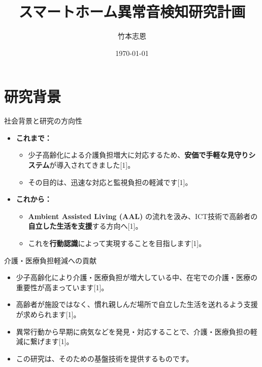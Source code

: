 \documentclass[unicode,12pt,aspectratio=169,dvipdfmx]{beamer}
\title{スマートホーム異常音検知研究計画} %
\author{竹本志恩} %
\date{\today}
\begin{document}
\begin{frame}
\titlepage
\end{frame}

\section{研究背景} %
\begin{frame}{社会背景と研究の方向性} %
    \begin{itemize}
        \item \textbf{これまで：}
        \begin{itemize}
            \item 少子高齢化による介護負担増大に対応するため、\textbf{安価で手軽な見守りシステム}が導入されてきました[1]。
            \item その目的は、迅速な対応と監視負担の軽減です[1]。
        \end{itemize}
        \item \textbf{これから：}
        \begin{itemize}
            \item \textbf{Ambient Assisted Living (AAL)} の流れを汲み、ICT技術で高齢者の\textbf{自立した生活を支援}する方向へ[1]。
            \item これを\textbf{行動認識}によって実現することを目指します[1]。
        \end{itemize}
    \end{itemize}
\end{frame}

\begin{frame}{介護・医療負担軽減への貢献} %
    \begin{itemize}
        \item 少子高齢化により介護・医療負担が増大している中、在宅での介護・医療の重要性が高まっています[1]。
        \item 高齢者が施設ではなく、慣れ親しんだ場所で自立した生活を送れるよう支援が求められます[1]。
        \item 異常行動から早期に病気などを発見・対応することで、介護・医療負担の軽減に繋げます[1]。
        \item この研究は、そのための基盤技術を提供するものです。
    \end{itemize}
\end{frame}
\end{document}
